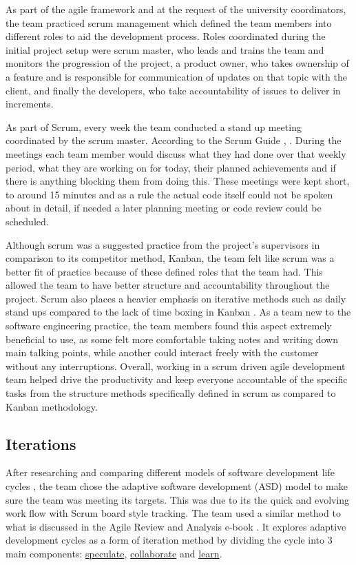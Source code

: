 \documentclass{l3proj}
\begin{document}
As part of the agile framework and at the request of the university coordinators, the team practiced scrum management which defined the team members into different roles to aid the development process. Roles coordinated during the initial project setup were scrum master, who leads and trains the team and monitors the progression of the project, a product owner, who takes ownership of a feature and is responsible for communication of updates on that topic with the client, and finally the developers, who take accountability of issues to deliver in increments.  

As part of Scrum, every week the team conducted a stand up meeting coordinated by the scrum master. According to the Scrum Guide \cite{ScrumGuide},  \cite{DailyScrum}. During the meetings each team member would discuss what they had done over that weekly period, what they are working on for today, their planned achievements and if there is anything blocking them from doing this. These meetings were kept short, to around 15 minutes and as a rule the actual code itself could not be spoken about in detail, if needed a later planning meeting or code review could be scheduled.

Although scrum was a suggested practice from the project's supervisors in comparison to its competitor method, Kanban, the team felt like scrum was a better fit of practice because of these defined roles that the team had. This allowed the team to have better structure and accountability throughout the project. Scrum also places a heavier emphasis on iterative methods such as daily stand ups compared to the lack of time boxing in Kanban \cite{ScrumvsKanban}. As a team new to the software engineering practice, the team members found this aspect extremely beneficial to use, as some felt more comfortable taking notes and writing down main talking points, while another could interact freely with the customer without any interruptions. Overall, working in a scrum driven agile development team helped drive the productivity and keep everyone accountable of the specific tasks from the structure methods specifically defined in scrum as compared to Kanban methodology.


\subsection{Iterations}
\label{subsec:iterations}
After researching and comparing different models of software development life cycles \cite{SDLC}, the team chose the adaptive software development (ASD) model to make sure the team was meeting its targets. This was due to its the quick and evolving work flow with Scrum board style tracking. The team used a similar method to what is discussed in the Agile Review and Analysis e-book \cite{IterationReviewAndAnalysis}. It explores adaptive development cycles as a form of iteration method by dividing the cycle into 3 main components: \hyperref[speculate]{speculate}, \hyperref[collab]{collaborate} and \hyperref[learn]{learn}. 
\end{document}

